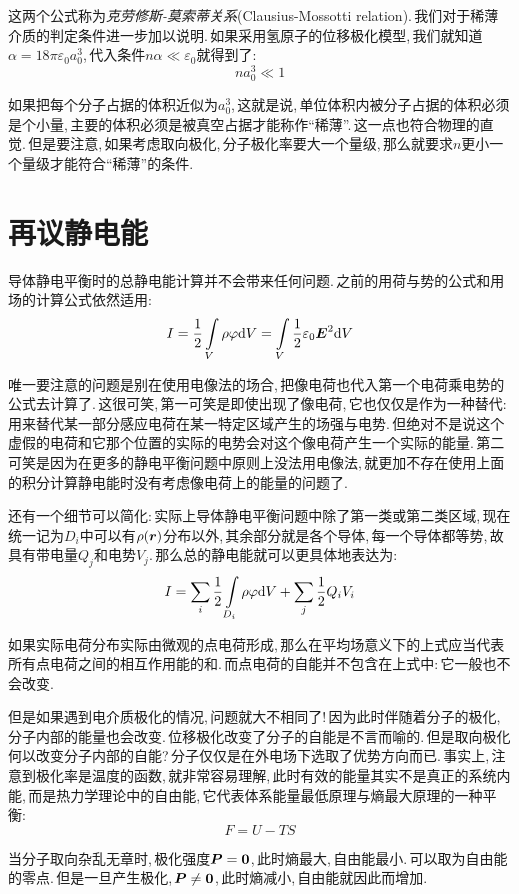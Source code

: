 这两个公式称为\emph{克劳修斯-莫索蒂关系}(Clausius-Mossotti relation).\,我们对于稀薄介质的判定条件进一步加以说明.\,如果采用氢原子的位移极化模型,\,我们就知道$\alpha =18\pi \varepsilon_0 a_0^3$,\,代入条件$n\alpha\ll \varepsilon_0$就得到了:
\[na_0^3\ll 1\]

如果把每个分子占据的体积近似为$a_0^3$,\,这就是说,\,单位体积内被分子占据的体积必须是个小量,\,主要的体积必须是被真空占据才能称作``稀薄''.\,这一点也符合物理的直觉.\,但是要注意,\,如果考虑取向极化,\,分子极化率要大一个量级,\,那么就要求$n$更小一个量级才能符合``稀薄''的条件.

\section{再议静电能}

导体静电平衡时的总静电能计算并不会带来任何问题.\,之前的用荷与势的公式和用场的计算公式依然适用:
\[I=\frac{1}{2}\int\limits_{V}\rho \varphi \textrm{d} V=\int\limits_{V}\frac{1}{2}\varepsilon_0\boldsymbol{E}^2\textrm{d} V\]

唯一要注意的问题是别在使用电像法的场合,\,把像电荷也代入第一个电荷乘电势的公式去计算了.\,这很可笑,\,第一可笑是即使出现了像电荷,\,它也仅仅是作为一种替代:\,用来替代某一部分感应电荷在某一特定区域产生的场强与电势.\,但绝对不是说这个虚假的电荷和它那个位置的实际的电势会对这个像电荷产生一个实际的能量.\,第二可笑是因为在更多的静电平衡问题中原则上没法用电像法,\,就更加不存在使用上面的积分计算静电能时没有考虑像电荷上的能量的问题了.

还有一个细节可以简化:\,实际上导体静电平衡问题中除了第一类或第二类区域,\,现在统一记为$D_i$中可以有$\rho(\boldsymbol{r})$分布以外,\,其余部分就是各个导体,\,每一个导体都等势,\,故具有带电量$Q_j$和电势$V_j$.\,那么总的静电能就可以更具体地表达为:
\[I=\sum_i \frac{1}{2}\int\limits_{D_i}\rho \varphi \textrm{d} V+\sum_j \frac{1}{2}Q_iV_i\]

如果实际电荷分布实际由微观的点电荷形成,\,那么在平均场意义下的上式应当代表所有点电荷之间的相互作用能的和.\,而点电荷的自能并不包含在上式中:\,它一般也不会改变.

但是如果遇到电介质极化的情况,\,问题就大不相同了!\,因为此时伴随着分子的极化,\,分子内部的能量也会改变.\,位移极化改变了分子的自能是不言而喻的.\,但是取向极化何以改变分子内部的自能?\,分子仅仅是在外电场下选取了优势方向而已.\,事实上,\,注意到极化率是温度的函数,\,就非常容易理解,\,此时有效的能量其实不是真正的系统内能,\,而是热力学理论中的自由能,\,它代表体系能量最低原理与熵最大原理的一种平衡:
\[F=U-TS\]

当分子取向杂乱无章时,\,极化强度$\boldsymbol{P}=\boldsymbol{0}$,\,此时熵最大,\,自由能最小.\,可以取为自由能的零点.\,但是一旦产生极化,\,$\boldsymbol{P}\neq\boldsymbol{0}$,\,此时熵减小,\,自由能就因此而增加.

